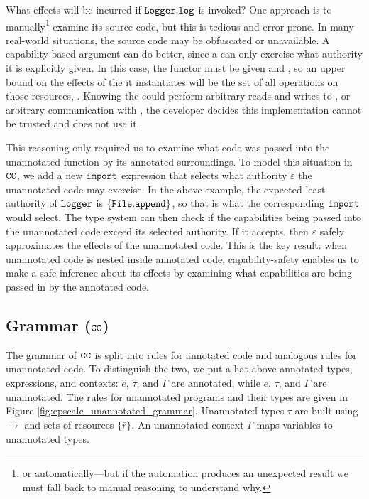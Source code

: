 What effects will be incurred if $\mathtt{Logger.log}$ is invoked? One
approach is to manually\footnote{or automatically---but if the
  automation produces an unexpected result we must fall back to manual
  reasoning to understand why.} examine its source code, but this is
tedious and error-prone. In many real-world situations, the source
code may be obfuscated or unavailable. A capability-based argument can do
better, since a  can only exercise what authority it is explicitly
given. In this case, the  functor must be given  and
, so an upper bound on the effects of the  it
instantiates will be the set of all operations on those resources,
. Knowing the  could perform
arbitrary reads and writes to , or arbitrary communication with , the developer decides this implementation cannot be trusted
and does not use it. 

This reasoning only required us to examine what code was passed into the
unannotated  function by its annotated surroundings. To model this
situation in $\mathtt{CC}$, we add a new $\mathtt{import}$ expression
that selects what authority $\varepsilon$ the unannotated code may
exercise. In the above example, the expected least authority of
$\mathtt{Logger}$ is $\{ \mathtt{File.append} \}$, so that is what the
corresponding $\mathtt{import}$ would select. The type system can then
check if the capabilities being passed into the unannotated code
exceed its selected authority. If it accepts, then $\varepsilon$
safely approximates the effects of the unannotated code. This is the
key result: when unannotated code is nested inside annotated code,
capability-safety enables us to make a safe inference about its
effects by examining what capabilities are being passed in by the
annotated code.

\vspace{-0.5cm}
\subsection{Grammar ($\mathtt{CC}$)}
\vspace{-0.2cm}

The grammar of $\mathtt{CC}$ is split into rules for annotated code and
analogous rules for unannotated code. To distinguish the two, we put a
hat above annotated types, expressions, and contexts: $\hat e$,
$\hat \tau$, and $\hat \Gamma$ are annotated, while $e$, $\tau$, and
$\Gamma$ are unannotated. The rules for unannotated programs and their
types are given in Figure
\ref{fig:epscalc_unannotated_grammar}. Unannotated types $\tau$ are
built using $\rightarrow$ and sets of resources $\{ \bar r \}$. An
unannotated context $\Gamma$ maps variables to unannotated
types.

